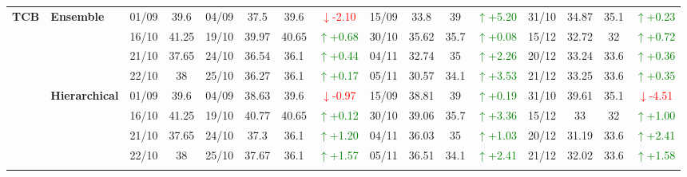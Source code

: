 {\begin{longtable}{llcc|cccc|cccc|cccc}
\multirow{12}{*}{\textbf{TCB}} 
& \textbf{Ensemble}
& 01/09 & 39.6 & 04/09 & 37.5 & 39.6 & \textcolor{red}{\(\downarrow\)-2.10} & 15/09 & 33.8 & 39 & \textcolor{green}{\(\uparrow\)+5.20} & 31/10 & 34.87 & 35.1 & \textcolor{green}{\(\uparrow\)+0.23} \\

&
& 16/10 & 41.25 & 19/10 & 39.97 & 40.65 & \textcolor{green}{\(\uparrow\)+0.68} & 30/10 & 35.62 & 35.7 & \textcolor{green}{\(\uparrow\)+0.08} & 15/12 & 32.72 & 32 & \textcolor{green}{\(\uparrow\)+0.72} \\

&
& 21/10 & 37.65 & 24/10 & 36.54 & 36.1 & \textcolor{green}{\(\uparrow\)+0.44} & 04/11 & 32.74 & 35 & \textcolor{green}{\(\uparrow\)+2.26} & 20/12 & 33.24 & 33.6 & \textcolor{green}{\(\uparrow\)+0.36} \\

&
& 22/10 & 38 & 25/10 & 36.27 & 36.1 & \textcolor{green}{\(\uparrow\)+0.17} & 05/11 & 30.57 & 34.1 & \textcolor{green}{\(\uparrow\)+3.53} & 21/12 & 33.25 & 33.6 & \textcolor{green}{\(\uparrow\)+0.35} \\
\cmidrule(lr){2-16}


& \textbf{Hierarchical}
& 01/09 & 39.6 & 04/09 & 38.63 & 39.6 & \textcolor{red}{\(\downarrow\)-0.97} & 15/09 & 38.81 & 39 & \textcolor{green}{\(\uparrow\)+0.19} & 31/10 & 39.61 & 35.1 & \textcolor{red}{\(\downarrow\)-4.51} \\

&
& 16/10 & 41.25 & 19/10 & 40.77 & 40.65 & \textcolor{green}{\(\uparrow\)+0.12} & 30/10 & 39.06 & 35.7 & \textcolor{green}{\(\uparrow\)+3.36} & 15/12 & 33 & 32 & \textcolor{green}{\(\uparrow\)+1.00} \\

&
& 21/10 & 37.65 & 24/10 & 37.3 & 36.1 & \textcolor{green}{\(\uparrow\)+1.20} & 04/11 & 36.03 & 35 & \textcolor{green}{\(\uparrow\)+1.03} & 20/12 & 31.19 & 33.6 & \textcolor{green}{\(\uparrow\)+2.41} \\

&
& 22/10 & 38 & 25/10 & 37.67 & 36.1 & \textcolor{green}{\(\uparrow\)+1.57} & 05/11 & 36.51 & 34.1 & \textcolor{green}{\(\uparrow\)+2.41} & 21/12 & 32.02 & 33.6 & \textcolor{green}{\(\uparrow\)+1.58} \\
\cmidrule(lr){2-16}




\end{longtable}}
